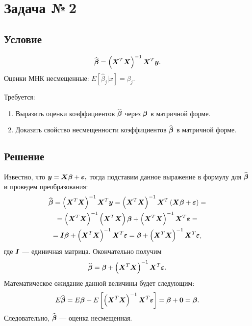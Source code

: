 \documentclass[12pt, a4paper]{article}
\renewcommand{\vec}[1]{\text{\mathversion{bold}${#1}$}}%
\newcommand{\eps}{\varepsilon}
\begin{document}
	
	\newpage
	\section{Задача №\,2}
	
		\subsection*{Условие}	
		
			$$
				\widehat{\vec \beta} = \left( \vec X^T \vec X \right)^{-1} \vec X^T \vec y.
			$$
			Оценки МНК несмещенные: $E \left[ \widehat{\beta}_j | x \right] = \beta_j$.
			
			Требуется: 
			\begin{enumerate}
				\item Выразить оценки коэффициентов $\widehat{\vec \beta}$ через $\vec \beta$ в матричной форме.
				\item Доказать свойство несмещенности коэффициентов $\widehat{ \vec \beta}$ в матричной форме.
			\end{enumerate}	
			
			
			
		
		\subsection*{Решение}
		
		Известно, что 
		$
		\vec{y} = \vec X \vec \beta + {\vec{\eps}},
		$ тогда подставим данное выражение в формулу для $\widehat{\vec \beta}$ и проведем преобразования: 
		\begin{multline*}
			\widehat{\vec \beta} = 
			\left( \vec X^T \vec X \right)^{-1} \vec X^T \vec y = 
			\left( \vec X^T \vec X \right)^{-1} \vec X^T \left(\vec X \vec \beta + {\vec{\eps}}\right)
			= \\ =
			\left( \vec X^T \vec X \right)^{-1}\left( \vec X^T \vec X \right) \vec \beta 
			+ \left( \vec X^T \vec X \right)^{-1} \vec X^T {\vec{\eps}} 
			= \\ = 
			\vec I \vec \beta 
			+ \left( \vec X^T \vec X \right)^{-1} \vec X^T {\vec{\eps}} = 
			\vec \beta 
			+ \left( \vec X^T \vec X \right)^{-1} \vec X^T {\vec{\eps}},
		\end{multline*}
		где $\vec I$ --- единичная матрица. Окончательно получим
		$$
			\widehat{\vec \beta} = \vec \beta 
			+ \left( \vec X^T \vec X \right)^{-1} \vec X^T {\vec{\eps}}.
		$$
		Математическое ожидание данной величины будет следующим: 
		$$
			E \widehat{\vec \beta} = E \vec \beta 
			+ E \left[\left( \vec X^T \vec X \right)^{-1} \vec X^T {\vec{\eps}}\right] = \vec \beta + \vec 0 = \vec \beta.
		$$
		Следовательно, $\widehat{ \vec \beta}$ --- оценка несмещенная.
		
\end{document}
